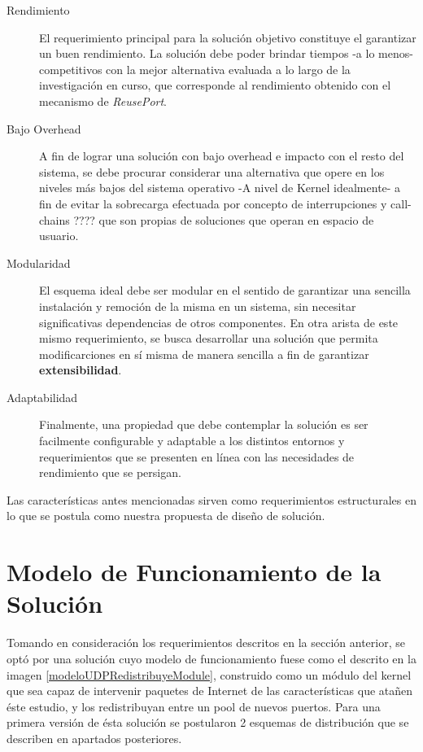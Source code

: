 \begin{description}
\item[Rendimiento] El requerimiento principal para la solución objetivo constituye el garantizar un buen rendimiento. La solución debe poder brindar tiempos -a lo menos- competitivos con la mejor alternativa evaluada a lo largo de la investigación en curso, que corresponde al rendimiento obtenido con el mecanismo de \emph{ReusePort}.
\item[Bajo Overhead] A fin de lograr una solución con bajo overhead e impacto con el resto del sistema, se debe procurar considerar una alternativa que opere en los niveles más bajos del sistema operativo -A nivel de Kernel idealmente- a fin de evitar la sobrecarga efectuada por concepto de interrupciones y call-chains ???? que son propias de soluciones que operan en espacio de usuario.
\item[Modularidad] El esquema ideal debe ser modular en el sentido de garantizar una sencilla instalación y remoción de la misma en un sistema, sin necesitar significativas dependencias de otros componentes. En otra arista de este mismo requerimiento, se busca desarrollar una solución que permita modificarciones en sí misma de manera sencilla a fin de garantizar \textbf{extensibilidad}.
\item[Adaptabilidad] Finalmente, una propiedad que debe contemplar la solución es ser facilmente configurable y adaptable a los distintos entornos y requerimientos que se presenten en línea con las necesidades de rendimiento que se persigan.
\end{description}

Las características antes mencionadas sirven como requerimientos estructurales en lo que se postula como nuestra propuesta de diseño de solución.

\section{Modelo de Funcionamiento de la Solución}
Tomando en consideración los requerimientos descritos en la sección anterior, se optó por una solución cuyo modelo de funcionamiento fuese como el descrito en la imagen \ref{modeloUDPRedistribuyeModule}, construido como un módulo del kernel que sea capaz de intervenir paquetes de Internet de las características que atañen éste estudio, y los redistribuyan entre un pool de nuevos puertos. Para una primera versión de ésta solución se postularon 2 esquemas de distribución que se describen en apartados posteriores.

